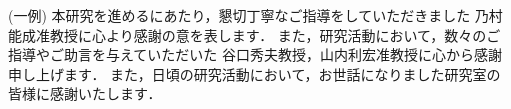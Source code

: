 \documentclass[tanilab-enum]{graduate}
\begin{document}
(一例)
本研究を進めるにあたり，懇切丁寧なご指導をしていただきました
乃村能成准教授に心より感謝の意を表します．
また，研究活動において，数々のご指導やご助言を与えていただいた
谷口秀夫教授，山内利宏准教授に心から感謝申し上げます．
また，日頃の研究活動において，お世話になりました研究室の
皆様に感謝いたします．





\end{document}
